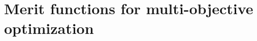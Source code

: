 \documentclass[../main]{subfiles}
\begin{document}
\chapter{Merit functions for multi-objective optimization} \label{sec:merit}












\end{document}
